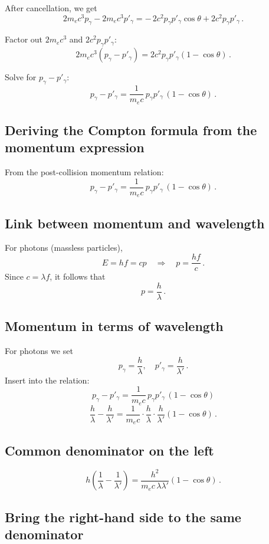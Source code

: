 After cancellation, we get
\[
2 m_e c^3 p_\gamma - 2 m_e c^3 p'_\gamma
= -\,2 c^2 p_\gamma p'_\gamma \cos\theta + 2 c^2 p_\gamma p'_\gamma\,.
\]

Factor out \( 2 m_e c^3 \) and \( 2 c^2 p_\gamma p'_\gamma \):
\[
2 m_e c^3 (p_\gamma - p'_\gamma)
= 2 c^2 p_\gamma p'_\gamma (1 - \cos\theta)\,.
\]

Solve for \( p_\gamma - p'_\gamma \):
\[
p_\gamma - p'_\gamma
= \frac{1}{m_e c}\, p_\gamma p'_\gamma \,(1 - \cos\theta)\,.
\]

\subsection{Deriving the Compton formula from the momentum expression}

From the post-collision momentum relation:
\[
p_\gamma - p'_\gamma
= \frac{1}{m_e c}\, p_\gamma p'_\gamma \,(1 - \cos\theta)\,.
\]

\subsection*{Link between momentum and wavelength}

For photons (massless particles),
\[
E = h f = c p \quad \Rightarrow \quad p = \frac{h f}{c}\,.
\]
Since \( c = \lambda f \), it follows that
\[
p = \frac{h}{\lambda}\,.
\]

\subsection*{Momentum in terms of wavelength}

For photons we set
\[
p_\gamma = \frac{h}{\lambda}, \quad p'_\gamma = \frac{h}{\lambda'}\,.
\]
Insert into the relation:
\[
p_\gamma - p'_\gamma
= \frac{1}{m_e c}\, p_\gamma p'_\gamma \,(1 - \cos\theta)
\]
\[
\frac{h}{\lambda} - \frac{h}{\lambda'}
= \frac{1}{m_e c}\cdot \frac{h}{\lambda} \cdot \frac{h}{\lambda'} (1 - \cos\theta)\,.
\]

\subsection*{Common denominator on the left}

\[
h \left( \frac{1}{\lambda} - \frac{1}{\lambda'} \right)
= \frac{h^2}{m_e c \,\lambda \lambda'} (1 - \cos\theta)\,.
\]

\subsection*{Bring the right-hand side to the same denominator}


